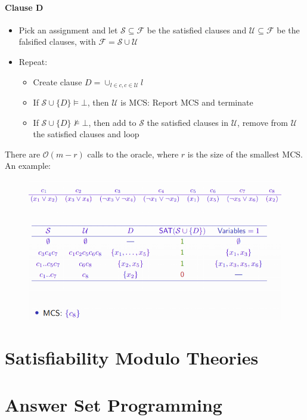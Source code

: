 \documentclass[10pt,a4paper]{report}
\begin{document}
\subsubsection{Clause D}
\begin{itemize}
    \item Pick an assignment and let $\mathcal{S} \subseteq \mathcal{F}$ be the satisfied clauses and $\mathcal{U} \subseteq \mathcal{F}$ be the falsified clauses, with $\mathcal{F} = \mathcal{S} \cup \mathcal{U}$
    \item Repeat:
    \begin{itemize}
        \item Create clause $D = \cup_{l \in c, c \in \mathcal{U}} l$
        \item If $\mathcal{S} \cup \{D\} \vDash \bot$, then $\mathcal{U}$ is MCS: Report MCS and terminate
        \item If $\mathcal{S} \cup \{D\} \nvDash \bot$, then add to $\mathcal{S}$ the satisfied clauses in $\mathcal{U}$, remove from $\mathcal{U}$ the satisfied clauses and loop
    \end{itemize}
\end{itemize}
There are $\mathcal{O}(m-r)$ calls to the oracle, where $r$ is the size of the smallest MCS. An example:
\begin{figure}[H]
    \centering
    \includegraphics[scale=0.4]{16.png}
\end{figure}


\chapter{Satisfiability Modulo Theories}
\chapter{Answer Set Programming}
\end{document}
